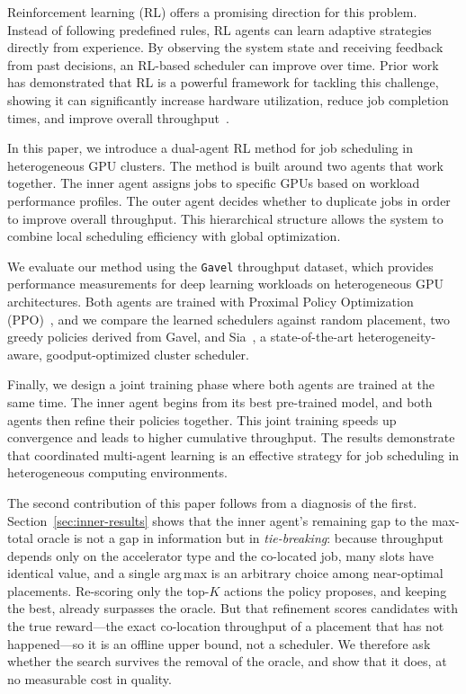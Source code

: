 \documentclass{article}
\begin{document}
Reinforcement learning (RL) offers a promising direction for this problem. Instead of following predefined rules, RL agents can learn adaptive strategies directly from experience. By observing the system state and receiving feedback from past decisions, an RL-based scheduler can improve over time. Prior work has demonstrated that RL is a powerful framework for tackling this challenge, showing it can significantly increase hardware utilization, reduce job completion times, and improve overall throughput~\cite{luan2019sched2,mao2019learning,venkataswamy2022launchpad}.

In this paper, we introduce a dual-agent RL method for job scheduling in heterogeneous GPU clusters. The method is built around two agents that work together. The inner agent assigns jobs to specific GPUs based on workload performance profiles. The outer agent decides whether to duplicate jobs in order to improve overall throughput. This hierarchical structure allows the system to combine local scheduling efficiency with global optimization.

We evaluate our method using the \texttt{Gavel} throughput dataset, which provides performance measurements for deep learning workloads on heterogeneous GPU architectures. Both agents are trained with Proximal Policy Optimization (PPO)~\cite{schulman2017ppo}, and we compare the learned schedulers against random placement, two greedy policies derived from Gavel, and Sia~\cite{zhong2023sia}, a state-of-the-art heterogeneity-aware, goodput-optimized cluster scheduler.

Finally, we design a joint training phase where both agents are trained at the same time. The inner agent begins from its best pre-trained model, and both agents then refine their policies together. This joint training speeds up convergence and leads to higher cumulative throughput. The results demonstrate that coordinated multi-agent learning is an effective strategy for job scheduling in heterogeneous computing environments.

The second contribution of this paper follows from a diagnosis of the first.
Section~\ref{sec:inner-results} shows that the inner agent's remaining gap to the
max-total oracle is not a gap in information but in \emph{tie-breaking}: because
throughput depends only on the accelerator type and the co-located job, many slots
have identical value, and a single arg\,max is an arbitrary choice among
near-optimal placements. Re-scoring only the top-$K$ actions the policy proposes,
and keeping the best, already surpasses the oracle. But that refinement scores
candidates with the true reward---the exact co-location throughput of a placement
that has not happened---so it is an offline upper bound, not a scheduler. We
therefore ask whether the search survives the removal of the oracle, and show that
it does, at no measurable cost in quality.
\end{document}
